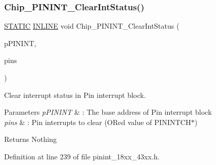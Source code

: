 \subsubsection{\texorpdfstring{Chip\+\_\+\+P\+I\+N\+I\+N\+T\+\_\+\+Clear\+Int\+Status()}{Chip\_PININT\_ClearIntStatus()}}
{\footnotesize\ttfamily \hyperlink{group___l_p_c___types___public___macros_ga10b2d890d871e1489bb02b7e70d9bdfb}{S\+T\+A\+T\+IC} \hyperlink{spifi__18xx__43xx_8h_a2eb6f9e0395b47b8d5e3eeae4fe0c116}{I\+N\+L\+I\+NE} void Chip\+\_\+\+P\+I\+N\+I\+N\+T\+\_\+\+Clear\+Int\+Status (\begin{DoxyParamCaption}\item[{\hyperlink{struct_l_p_c___p_i_n___i_n_t___t}{L\+P\+C\+\_\+\+P\+I\+N\+\_\+\+I\+N\+T\+\_\+T} $\ast$}]{p\+P\+I\+N\+I\+NT,  }\item[{uint32\+\_\+t}]{pins }\end{DoxyParamCaption})}



Clear interrupt status in Pin interrupt block. 


\begin{DoxyParams}{Parameters}
{\em p\+P\+I\+N\+I\+NT} & \+: The base address of Pin interrupt block \\
\hline
{\em pins} & \+: Pin interrupts to clear (O\+Red value of P\+I\+N\+I\+N\+T\+C\+H$\ast$) \\
\hline
\end{DoxyParams}
\begin{DoxyReturn}{Returns}
Nothing 
\end{DoxyReturn}


Definition at line 239 of file pinint\+\_\+18xx\+\_\+43xx.\+h.

\mbox{\label{group___p_i_n_i_n_t__18_x_x__43_x_x_ga66b7cbb3ab402c14cd89602820211f67}} 
